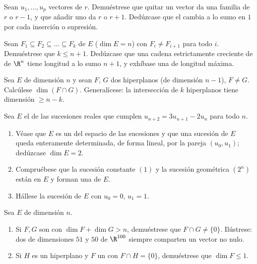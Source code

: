 \begin{exercise}[$\star\star$]\label{exo:b1:findim:7}
Sean $u_1, \dots, u_p$ vectores de  $r$. Demuéstrese que quitar
un vector da una familia de  $r$ o $r - 1$, y que añadir uno da
 $r$ o $r + 1$. Dedúzcase que el  cambia a lo sumo en $1$
por cada inserción o supresión.
\end{exercise}

\begin{exercise}[$\star\star\star$]\label{exo:b1:findim:8}
Sean $F_1 \subseteq F_2 \subseteq \dots \subseteq F_k$ 
de $E$ ($\dim E = n$) con $F_i \neq F_{i+1}$ para todo $i$.
Demuéstrese que $k \leq n + 1$. Dedúzcase que una cadena
estrictamente creciente de  de $\R^n$ tiene longitud a lo
sumo $n + 1$, y exhíbase una de longitud máxima.
\end{exercise}

\begin{exercise}[$\star\star\star$]\label{exo:b1:findim:9}
Sea $E$ de dimensión $n$ y sean $F$, $G$ dos hiperplanos (de
dimensión $n - 1$), $F \neq G$. Calcúlese $\dim(F \cap G)$.
Generalícese: la intersección de $k$ hiperplanos tiene dimensión
$\geq n - k$.
\end{exercise}

\begin{exercise}[$\star\star$]\label{exo:b1:findim:10}
Sea $E$ el  de las sucesiones reales que cumplen
$u_{n+2} = 3u_{n+1} - 2u_n$ para todo $n$.
\begin{enumerate}
  \item Véase que $E$ es un  del espacio de las sucesiones
        y que una sucesión de $E$ queda enteramente determinada, de
        forma lineal, por la pareja $(u_0, u_1)$; dedúzcase
        $\dim E = 2$.
  \item Compruébese que la sucesión constante $(1)$ y la sucesión
        geométrica $(2^n)$ están en $E$ y forman una  de $E$.
  \item Hállese la sucesión de $E$ con $u_0 = 0$, $u_1 = 1$.
\end{enumerate}
\end{exercise}

\begin{exercise}[$\star\star$]\label{exo:b1:findim:11}
Sea $E$ de dimensión $n$.
\begin{enumerate}
  \item Si $F, G$ son  con $\dim F + \dim G > n$,
        demuéstrese que $F \cap G \neq \{0\}$. Ilústrese: dos
         de dimensiones $51$ y $50$ de $\R^{100}$
        siempre comparten un vector no nulo.
  \item Si $H$ es un hiperplano y $F$ un  con
        $F \cap H = \{0\}$, demuéstrese que $\dim F \leq 1$.
\end{enumerate}
\end{exercise}

